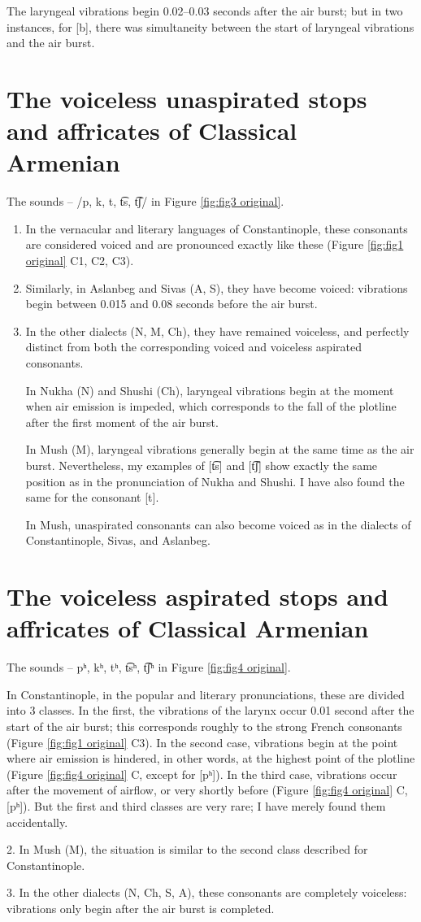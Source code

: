 \documentclass[output=paper]{langscibook}
\begin{document}
The laryngeal vibrations begin 0.02–0.03 seconds after the air burst; but in two instances, for [b], there was simultaneity between the start of laryngeal vibrations and the air burst.

\section{The voiceless unaspirated stops and affricates of Classical Armenian}

The sounds  – /p,  k,  t, t͡s,  t͡ʃ/ in Figure \ref{fig:fig3 original}. 

\begin{enumerate}
\item In the vernacular and literary languages of Constantinople, these consonants are considered voiced and are pronounced exactly like these (Figure \ref{fig:fig1 original} C1, C2, C3).
\item Similarly, in Aslanbeg and Sivas (A, S), they have become voiced: vibrations begin between 0.015 and 0.08 seconds before the air burst.
\item In the other dialects (N, M, Ch), they have remained voiceless, and perfectly distinct from both the corresponding voiced and voiceless aspirated consonants.

In Nukha (N) and Shushi (Ch), laryngeal vibrations begin at the moment when air emission is impeded, which corresponds to the fall of the plotline after the first moment of the air burst.

In Mush (M), laryngeal vibrations generally begin at the same time as the air burst. Nevertheless, my examples of [t͡s] and [t͡ʃ] show exactly the same position as in the pronunciation of Nukha and Shushi. I have also found the same for the consonant [t].

In Mush, unaspirated consonants can also become voiced as in the dialects of Constantinople, Sivas, and Aslanbeg.
\end{enumerate}

\section{The  voiceless aspirated stops and affricates of Classical Armenian}

The sounds  –  pʰ, kʰ, tʰ,  t͡sʰ,  t͡ʃʰ in Figure \ref{fig:fig4 original}.


In Constantinople, in the popular and literary pronunciations, these are divided into 3 classes. In the first, the vibrations of the larynx occur 0.01 second after the start of the air burst; this corresponds roughly to the strong French consonants (Figure \ref{fig:fig1 original} C3). In the second case, vibrations begin at the point where air emission is hindered, in other words, at the highest point of the plotline (Figure \ref{fig:fig4 original} C, except for [pʰ]). In the third case, vibrations occur after the movement of airflow, or very shortly before (Figure \ref{fig:fig4 original} C, [pʰ]). But the first and third classes are very rare; I have merely found them accidentally.

2. In Mush (M), the situation is similar to the second class described for Constantinople.

3. In the other dialects (N, Ch, S, A), these consonants are completely voiceless: vibrations only begin after the air burst is completed.

\printbibliography[heading=subbibliography]
\end{document}
